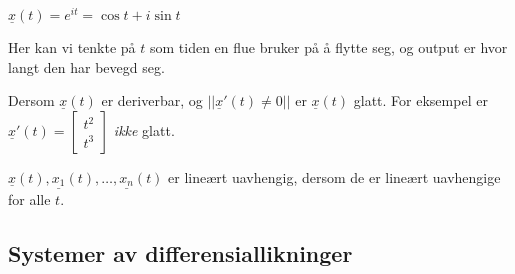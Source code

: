 \documentclass[11pt, a4paper, norsk]{article}
\begin{document}
            \begin{Example}{}{}
                $\underline{x}(t) = e^{it} = \cos{t} + i \sin{t}$

                Her kan vi tenkte på $t$ som tiden en flue bruker på å flytte seg, og output er hvor langt den har bevegd seg. 
            \end{Example}

            Dersom $\underline{x}(t)$ er deriverbar, og $||\underline{x}'(t) \neq 0||$ er $\underline{x}(t)$ glatt. For eksempel er $\underline{x}'(t) = \begin{bmatrix}
                t^2 \\
                t^3
            \end{bmatrix}$ \textit{ikke} glatt. 
            
            $\underline{x}(t), \underline{x_1}(t), \dots ,\underline{x_{n}}(t)$ er lineært uavhengig, dersom de er lineært uavhengige for alle $t$.

            \subsection{Systemer av differensiallikninger}%
            \label{sub:systemer_av_differensiallikninger}
            
\end{document}

